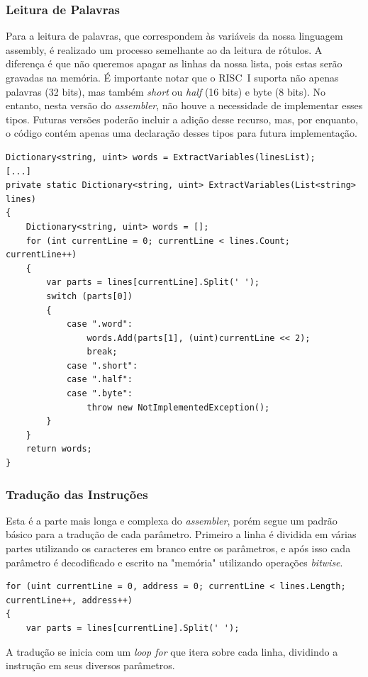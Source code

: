 \documentclass[
	article,			%
	11pt,				%
	oneside,			%
	a4paper,			%
	english,			%
	brazil,				%
	sumario=tradicional
	]{abntex2}
\begin{document}
\subsubsection{Leitura de Palavras}

Para a leitura de palavras, que correspondem às variáveis da nossa linguagem assembly, é realizado um processo semelhante ao da leitura de rótulos. A diferença é que não queremos apagar as linhas da nossa lista, pois estas serão gravadas na memória. É importante notar que o RISC~I suporta não apenas palavras (32 bits), mas também \textit{short} ou \textit{half} (16 bits) e byte (8 bits). No entanto, nesta versão do \textit{assembler}, não houve a necessidade de implementar esses tipos. Futuras versões poderão incluir a adição desse recurso, mas, por enquanto, o código contém apenas uma declaração desses tipos para futura implementação.


\begin{lstlisting}
Dictionary<string, uint> words = ExtractVariables(linesList);
[...]
private static Dictionary<string, uint> ExtractVariables(List<string> lines)
{
    Dictionary<string, uint> words = [];
    for (int currentLine = 0; currentLine < lines.Count; currentLine++)
    {
        var parts = lines[currentLine].Split(' ');
        switch (parts[0])
        {
            case ".word":
                words.Add(parts[1], (uint)currentLine << 2);
                break;
            case ".short":
            case ".half":
            case ".byte":
                throw new NotImplementedException();
        }
    }
    return words;
}
\end{lstlisting}

\subsubsection{Tradução das Instruções}

Esta é a parte mais longa e complexa do \textit{assembler}, porém segue um padrão básico para a tradução de cada parâmetro. Primeiro a linha é dividida em várias partes utilizando os caracteres em branco entre os parâmetros, e após isso cada parâmetro é decodificado e escrito na "memória" utilizando operações \textit{bitwise}.

\begin{lstlisting}
for (uint currentLine = 0, address = 0; currentLine < lines.Length; currentLine++, address++)
{
    var parts = lines[currentLine].Split(' ');
\end{lstlisting}
A tradução se inicia com um \textit{loop for} que itera sobre cada linha, dividindo a instrução em seus diversos parâmetros.
\end{document}
